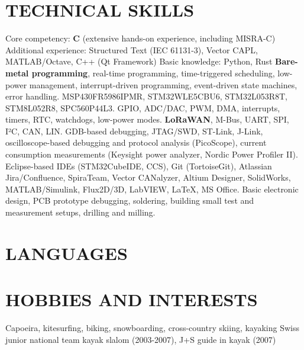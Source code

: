 \documentclass[10pt,a4paper,sans]{moderncv}
\begin{document}
     \section{TECHNICAL SKILLS}
    {
        Core competency: \textbf{C} (extensive hands-on experience, including MISRA-C) \newline
        Additional experience: Structured Text (IEC 61131-3), Vector CAPL, MATLAB/Octave, C++ (Qt Framework) \newline
        Basic knowledge: Python, Rust
    }
    {
        \textbf{Bare-metal programming}, real-time programming, time-triggered scheduling, low-power management, interrupt-driven programming, event-driven state machines, error handling.
    }
     {
         MSP430FR5986IPMR, STM32WLE5CBU6, STM32L053R8T, STM8L052R8, SPC560P44L3.
     }
     {
         GPIO, ADC/DAC, PWM, DMA, interrupts, timers, RTC, watchdogs, low-power modes.
     }
    {
        \textbf{LoRaWAN}, M-Bus, UART, SPI, I²C, CAN, LIN.
    }
     {
         GDB-based debugging, JTAG/SWD, ST-Link, J-Link, oscilloscope-based debugging and protocol analysis (PicoScope), current consumption measurements (Keysight power analyzer, Nordic Power Profiler II).
     }
     {
         Eclipse-based IDEs (STM32CubeIDE, CCS), Git (TortoiseGit), Atlassian Jira/Confluence, SpiraTeam, Vector CANalyzer, Altium Designer, SolidWorks, MATLAB/Simulink, Flux2D/3D, LabVIEW, LaTeX, MS Office.
     }
     {
         Basic electronic design, PCB prototype debugging, soldering, building small test and measurement setups, drilling and milling.
     }

    \section{LANGUAGES}

    \section{HOBBIES AND INTERESTS}
    {
        Capoeira, kitesurfing, biking, snowboarding, cross-country skiing, kayaking\newline
        Swiss junior national team kayak slalom (2003-2007), J+S guide in kayak (2007)
    }
\end{document}
